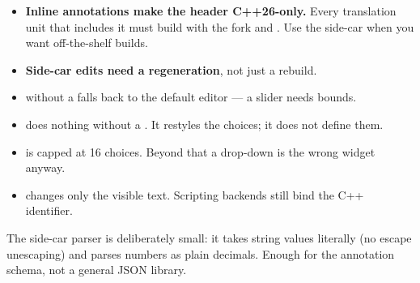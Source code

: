 \begin{itemize}
  \item \textbf{Inline annotations make the header C++26-only.} Every
    translation unit that includes it must build with the fork and
    . Use the side-car when you want off-the-shelf
    builds.
  \item \textbf{Side-car edits need a regeneration}, not just a rebuild.
  \item {} without a  falls back to the default
    editor --- a slider needs bounds.
  \item {} does nothing without a . It restyles
    the choices; it does not define them.
  \item {} is capped at 16 choices. Beyond that a drop-down is the
    wrong widget anyway.
  \item {} changes only the visible text. Scripting backends still
    bind the C++ identifier.
\end{itemize}

\begin{note}
The side-car parser is deliberately small: it takes string values literally (no
escape unescaping) and parses numbers as plain decimals. Enough for the
annotation schema, not a general JSON library.
\end{note}
